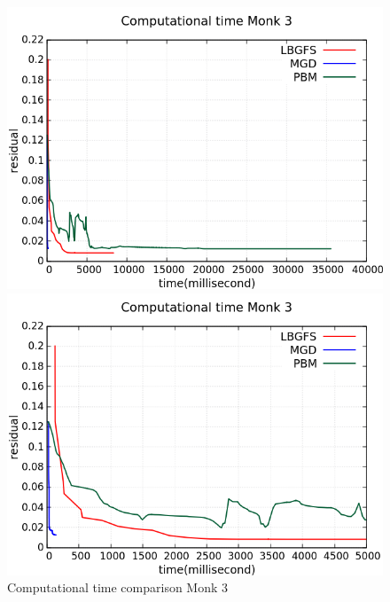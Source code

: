 \begin{figure}[H]
	\centering
	\begin{minipage}[t]{0.5\linewidth}
		\includegraphics[width=\linewidth]{data/Comparison/Monk3/Monk3_CT_Comparison_standard.png}
	\end{minipage}%
	\begin{minipage}[t]{0.5\linewidth}
		\includegraphics[width=\linewidth]{data/Comparison/Monk3/Monk3_CT_Comparison_zoom.png}
	\end{minipage}
	\caption{Computational time comparison Monk 3}
	\label{CT-Monk3}
\end{figure}



